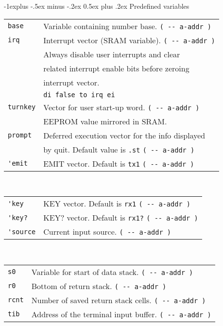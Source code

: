 \documentclass[10pt,landscape,a4paper]{article}
\makeatletter
\renewcommand{\subsection}{\@startsection{subsection}{2}{0mm}%
                                {-1explus -.5ex minus -.2ex}%
                                {0.5ex plus .2ex}%
                                {\normalfont\normalsize\bfseries}}
\makeatother
\begin{document}
\begin{multicols}{3}
\subsection{Predefined variables}
\begin{tabular}{@{}ll@{}}
\verb!base!  & Variable containing number base. \verb!( -- a-addr )! \\
\verb!irq!  & Interrupt vector (SRAM variable). \verb!( -- a-addr )! \\
            & Always disable user interrupts and clear \\
            & related interrupt enable bits before zeroing \\
            & interrupt vector. \\
            & \verb!di false to irq ei! \\
\verb!turnkey!  & Vector for user start-up word. \verb!( -- a-addr )! \\
                & EEPROM value mirrored in SRAM. \\
\verb!prompt!  & Deferred execution vector for the info displayed \\
               & by quit. Default value is \verb!.st! \verb!( -- a-addr )! \\
\verb!'emit!  & EMIT vector.  Default is \verb!tx1! \verb!( -- a-addr )! \\
\end{tabular}\\
\begin{tabular}{@{}ll@{}}
\verb!'key!  & KEY vector.  Default is \verb!rx1! \verb!( -- a-addr )! \\
\verb!'key?!  & KEY? vector.  Default is \verb!rx1?!  \verb!( -- a-addr )! \\
\verb!'source!  & Current input source. \verb!( -- a-addr )! \\
\end{tabular}\\
\begin{tabular}{@{}ll@{}}
\verb!s0!   & Variable for start of data stack. \verb!( -- a-addr )! \\
\verb!r0!   & Bottom of return stack. \verb!( -- a-addr )! \\
\verb!rcnt! & Number of saved return stack cells. \verb!( -- a-addr )! \\
\verb!tib!  & Address of the terminal input buffer. \verb!( -- a-addr )! \\

\end{tabular}
\end{multicols}
\end{document}
